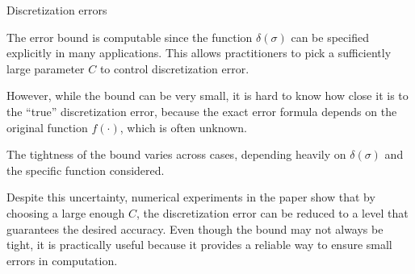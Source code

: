 \documentclass{beamer}
\begin{document}
\begin{frame}{Discretization errors}


    {\footnotesize \scriptsize
    \par The error bound is computable since the function \(\delta(\sigma)\) can be specified explicitly 
    in many applications. This allows practitioners to pick a sufficiently large parameter \(C\) to control discretization error.
    \vspace{1em}
    \par However, while the bound can be very small, it is hard to know how close it is to the ``true'' discretization error, 
    because the exact error formula depends on the original function \(f(\cdot)\), which is often unknown.
     \vspace{1em}
    \par  \pause The tightness of the bound varies across cases, depending heavily on \(\delta(\sigma)\) and the specific function considered.
     \vspace{1em}
    \par  Despite this uncertainty, numerical experiments in the paper show that by
    choosing a large enough \(C\), the discretization error can be reduced to a level that guarantees the desired accuracy. Even though the bound may not always be tight, 
    it is practically useful because it provides a reliable way to ensure small errors in computation.
    }
    
\end{frame}
\end{document}

